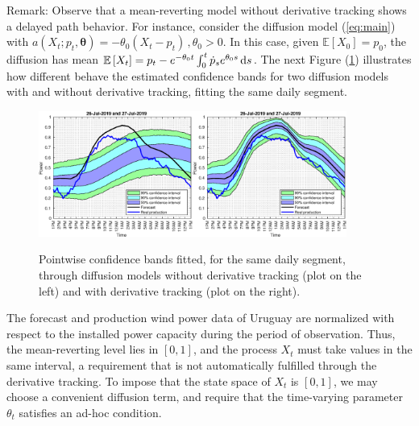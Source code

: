 \documentclass[11pt]{article}
\theoremstyle{definition}
\begin{document}
Remark: Observe that a mean-reverting model without derivative tracking shows a delayed path behavior. For instance, consider the diffusion model (\ref{eq:main}) with $a(X_t; p_t, \bm{\theta}) = - \theta_0 (X_t - p_t)\,, \theta_0 > 0$. In this case, given  $ \mathbb{E} \left[X_0\right] = p_0$, the diffusion has mean $\mathbb{E} \left[X_t\right] = p_t - e^{- \theta_0 t } \int_0^t \dot{p}_s  e^{\theta_0 s} \dif s$. The next Figure (\ref{fig:derivative_tracking}) illustrates how different behave the estimated confidence bands for two diffusion models with and without derivative tracking, fitting the same daily segment.

\begin{figure}[H]
\centering
  \includegraphics[width=0.45\textwidth]{plots/31.eps}\includegraphics[width=0.45\textwidth]{plots/31_2.eps}
  \caption{Pointwise confidence bands fitted, for the same daily segment, through diffusion models without derivative tracking (plot on the left) and with derivative tracking (plot on the right).}
  \label{fig:derivative_tracking}
\end{figure}

The forecast and production wind power data of Uruguay are normalized with respect to the installed power capacity during the period of observation. Thus, the mean-reverting level lies in $[0,1]$, and the process $X_t$  must take values in the same interval, a requirement that is not automatically fulfilled through the derivative tracking. To impose that the state space of $X_t$ is $[0,1]$, we may choose a convenient diffusion term, and require that the time-varying parameter $ \theta_t$ satisfies an ad-hoc condition.
 
\end{document}
